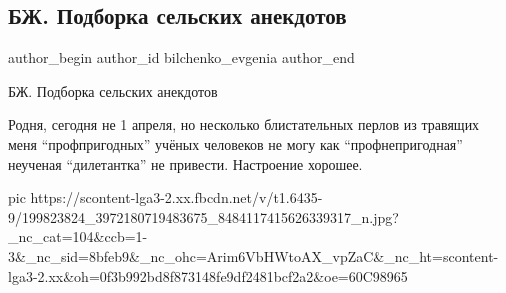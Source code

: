  
 
 
 
 
 
\subsection{БЖ. Подборка сельских анекдотов}
\label{sec:12_06_2021.fb.bilchenko_evgenia.2.anekdoty}
\ifcmt
 author_begin
   author_id bilchenko_evgenia
 author_end
\fi

БЖ. Подборка сельских анекдотов

Родня, сегодня не 1 апреля, но несколько блистательных  перлов из травящих меня
\enquote{профпригодных} учёных человеков не могу как \enquote{профнепригодная} неученая
\enquote{дилетантка} не привести. Настроение хорошее.

\ifcmt
  pic https://scontent-lga3-2.xx.fbcdn.net/v/t1.6435-9/199823824_3972180719483675_8484117415626339317_n.jpg?_nc_cat=104&ccb=1-3&_nc_sid=8bfeb9&_nc_ohc=Arim6VbHWtoAX_vpZaC&_nc_ht=scontent-lga3-2.xx&oh=0f3b992bd8f873148fe9df2481bcf2a2&oe=60C98965
\fi

